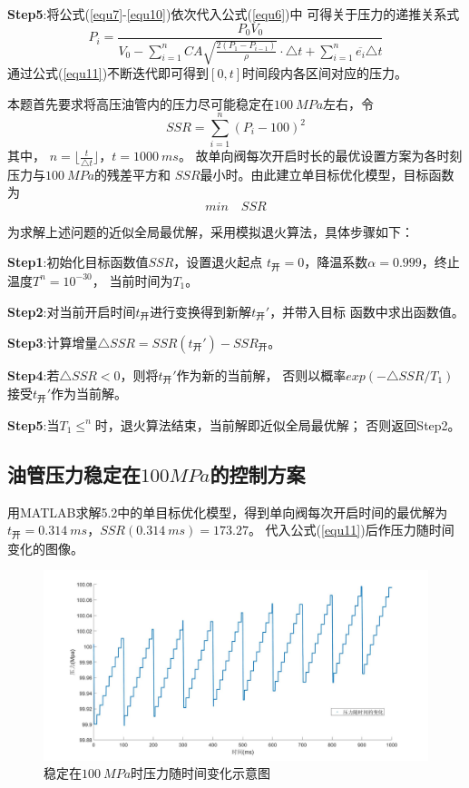 \documentclass[withoutpreface,bwprint]{cumcmthesis} %
\begin{document}
    \textbf{Step5}:将公式(\ref{equ7}-\ref{equ10})依次代入公式(\ref{equ6})中
    可得关于压力的递推关系式
    \begin{equation}
        P_i=\frac{P_0V_0}
        {V_0-\sum\limits_{i=1}^n CA\sqrt{\frac{2(P_1-P_{i-1})}{\rho}}\cdot\triangle t +\sum\limits_{i=1}^n \overline{e_i}\triangle t}
    \label{equ11}
    \end{equation}
    通过公式(\ref{equ11})不断迭代即可得到$[0,t]$时间段内各区间对应的压力。

    本题首先要求将高压油管内的压力尽可能稳定在$100~MPa$左右，令
    \begin{equation}
        SSR=\sum\limits_{i=1}^n (P_i-100)^2
    \label{equ12}
    \end{equation}
    其中，
    $n=\lfloor{\frac{t}{\triangle t}}\rfloor$，$t=1000~ms$。
    故单向阀每次开启时长的最优设置方案为各时刻压力与$100~MPa$的残差平方和
    $SSR$最小时。由此建立单目标优化模型，目标函数为
    \begin{equation}
       min \quad SSR
    \label{equ13}
    \end{equation}

    为求解上述问题的近似全局最优解，采用模拟退火算法，具体步骤如下：

    \textbf{Step1}:初始化目标函数值$SSR$，设置退火起点
    $t_{\text{开}}=0$，降温系数$\alpha=0.999$，终止温度$T^n=10^{-30}$，
    当前时间为$T_1$。

    \textbf{Step2}:对当前开启时间$t_{\text{开}}$进行变换得到新解$t_{\text{开}}'$，并带入目标
    函数中求出函数值。

    \textbf{Step3}:计算增量$\triangle SSR=SSR(t_{\text{开}}')-SSR_{\text{开}}$。
    
    \textbf{Step4}:若$\triangle SSR<0$，则将$t_{\text{开}}'$作为新的当前解，
    否则以概率$exp(-\triangle SSR/T_1)$接受$t_{\text{开}}'$作为当前解。

    \textbf{Step5}:当$T_1 \leq ^n$时，退火算法结束，当前解即近似全局最优解；
    否则返回Step2。

\subsection{油管压力稳定在$100MPa$的控制方案}
    用MATLAB求解5.2中的单目标优化模型，得到单向阀每次开启时间的最优解为
    $t_{\text{开}}=0.314~ms$，$SSR(0.314~ms)=173.27$。
    代入公式(\ref{equ11})后作压力随时间变化的图像。 
    \begin{figure}[!h]
    \centering
    \includegraphics[width=.95\textwidth]{100Mpa.jpg}
    \caption{稳定在$100~MPa$时压力随时间变化示意图}
    \label{figure3}
    \end{figure}
\end{document}
